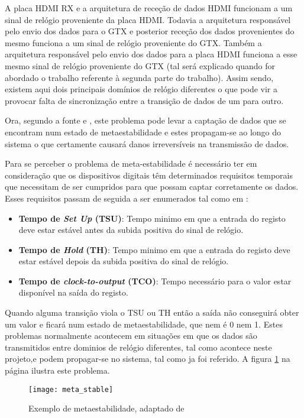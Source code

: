 A placa HDMI RX e a arquitetura de receção de dados HDMI funcionam a um sinal de relógio proveniente da placa HDMI. Todavia a arquitetura responsável pelo envio dos dados para o GTX e posterior receção dos dados provenientes do mesmo funciona a um sinal de relógio proveniente do GTX. Também a arquitetura responsável pelo envio dos dados para a placa HDMI funciona a esse mesmo sinal de relógio proveniente do GTX (tal será explicado quando for abordado o trabalho referente à segunda parte do trabalho). Assim sendo, existem aqui dois principais domínios de relógio diferentes o que pode vir a provocar falta de sincronização entre a transição de dados de um para outro.


Ora, segundo a fonte \cite{R024} e \cite{R037}, este problema pode levar a captação de dados que se encontram num estado de metaestabilidade e estes propagam-se ao longo do sistema o que certamente causará danos irreversíveis na transmissão de dados. 

Para se perceber o problema de meta-estabilidade é necessário ter em consideração que os dispositivos digitais têm determinados requisitos temporais que necessitam de ser cumpridos para que possam captar corretamente os dados. Esses requisitos passam de seguida a ser enumerados tal como em \cite{R037}:

\begin{itemize}
	\item \textbf{Tempo de \textit{Set Up} (T{\tiny SU})}: Tempo minimo em que a entrada do registo deve estar estável antes da subida positiva do sinal de relógio.
	\item \textbf{Tempo de \textit{Hold} (T{\tiny H})}: Tempo minimo em que a entrada do registo deve estar estável depois da subida positiva do sinal de relógio.
	\item \textbf{Tempo de \textit{clock-to-output} (T{\tiny CO})}: Tempo necessário para o valor estar disponível na saída do registo.
\end{itemize}
 
Quando alguma transição viola o T{\tiny SU} ou T{\tiny H} então a saída não conseguirá obter um valor e ficará num estado de metaestabilidade, que nem é 0 nem 1. Estes problemas normalmente acontecem em situações em que os dados são transmitidos entre dominios de relógio diferentes, tal como acontece neste projeto,e podem propagar-se no sistema, tal como ja foi referido. A figura \ref{fig:metaestabilidade} na página \pageref{fig:metaestabilidade} ilustra este problema.

\begin{figure}[h!]
	\begin{center}
		\leavevmode
		\texttt{[image: meta\_stable]}
		\caption{Exemplo de metaestabilidade, adaptado de \cite{R037}}
		\label{fig:metaestabilidade}
	\end{center}
\end{figure}

